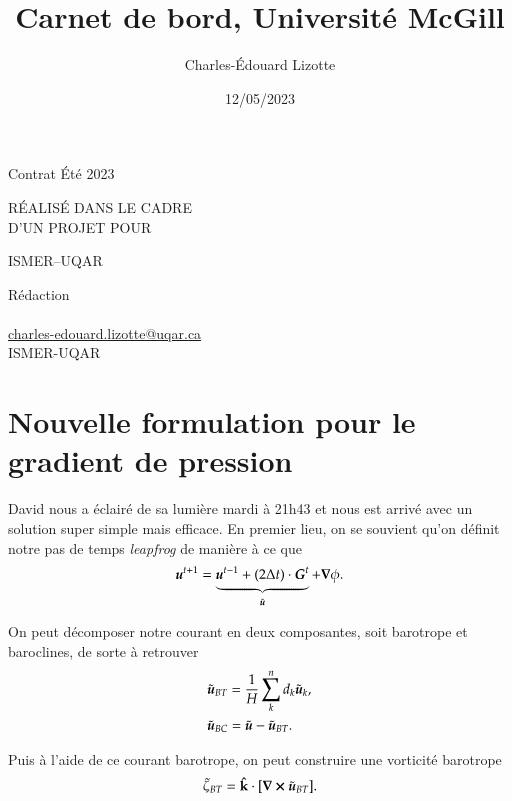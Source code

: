 \documentclass[10pt]{article}
\author{Charles-Édouard Lizotte}
\date{12/05/2023}
\title{Carnet de bord, Université McGill}
\makeatletter
\numberwithin{equation}{section}
\newcommand{\kvf}{\vb{\hat{k}}}
\newcommand{\uu}{\vb*{u}}
\newcommand{\mytitlepage}{
\begin{titlepage}
\begin{center}
{\Large Contrat Été 2023 \par}
\vspace{2cm}
{\Large \MakeUppercase{\thetitle} \par}
\vspace{2cm}
RÉALISÉ DANS LE CADRE\\ D'UN PROJET POUR \par
\vspace{2cm}
{\Large ISMER--UQAR \par}
\vspace{2cm}
{\thedate}
\end{center}
\vfill
Rédaction \\
{\theauthor}\\
\url{charles-edouard.lizotte@uqar.ca}\\
ISMER-UQAR
\end{titlepage}
}
\makeatother
\begin{document}
\mytitlepage
\tableofcontents\newpage

\section{Nouvelle formulation pour le gradient de pression}
\label{sec:org5b3584b}

David nous a éclairé de sa lumière mardi à 21h43 et nous est arrivé avec un solution super simple mais efficace.
En premier lieu, on se souvient qu'on définit notre pas de temps \emph{leapfrog} de manière à ce que
\begin{equation}
 \uu^{t+1} = \underbrace{ \uu^{t-1} + (2\Delta t)\cdot \vb*{G}^t}_{\tilde{\uu}} + \gradient{\phi}.
\end{equation}

On peut décomposer notre courant en deux composantes, soit barotrope et baroclines, de sorte à retrouver
\begin{subequations}
\begin{align}
 & \tilde{\uu}_{BT} = \frac{1}{H} \sum_k^n d_k \tilde{\uu}_k, \\
 & \tilde{\uu}_{BC} = \tilde{\uu} - \tilde{\uu}_{BT}.
\end{align}
\end{subequations}

Puis à l'aide de ce courant barotrope, on peut construire une vorticité barotrope
\begin{equation}
 \tilde{\zeta}_{BT} = \kvf \cdot \qty[\curl{\tilde{\uu}_{BT}}].
\end{equation}
\end{document}
